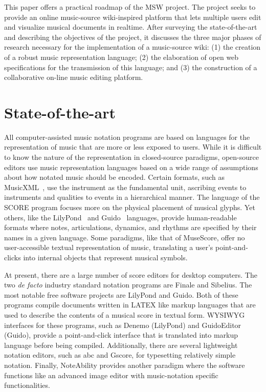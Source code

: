 \documentclass{article}
\begin{document}
This paper offers a practical roadmap
of the MSW project. The project seeks to provide an online music-source
wiki-inspired platform that lets multiple users edit and visualize
musical documents in realtime. After surveying the
state-of-the-art and describing the objectives of the project,
it discusses the three major phases of research necessary
for the implementation of a music-source wiki: (1) the creation of a robust
music representation language; (2) the elaboration of open web
specifications for the transmission of this language; and (3) the
construction of a collaborative on-line music editing platform.
\section{State-of-the-art}\label{sec:state-of-the-art}

All computer-assisted music notation programs are based on languages for the
representation of music that are more or less exposed to users. While it is
difficult to know the nature of the representation in closed-source
paradigms, open-source editors use music representation languages based on a
wide range of assumptions about how notated music should be encoded. Certain
formats, such as MusicXML~\cite{good2001musicxml}, use the instrument as the fundamental unit,
ascribing events to instruments and qualities to events in a hierarchical
manner. The language of the SCORE program focuses more on the physical
placement of musical glyphs. Yet others, like the LilyPond~\cite{lilypond06} and
Guido~\cite{hoos98}
languages, provide human-readable formats where notes, articulations,
dynamics, and rhythms are specified by their names in a given language. Some
paradigms, like that of MuseScore, offer no user-accessible textual representation
of music, translating a user’s point-and-clicks into internal objects that
represent musical symbols.

At present, there are a large number of score editors for desktop computers.
The two \emph{de facto} industry standard notation programs are Finale and
Sibelius. The most notable free software projects are LilyPond and
Guido. Both of these programs compile documents written in LATEX like
markup languages that are used to describe the contents of a musical score
in textual form. WYSIWYG interfaces for these programs, such as Denemo
(LilyPond) and GuidoEditor (Guido), provide a point-and-click interface that
is translated into markup language before being compiled. Additionally,
there are several lightweight notation editors, such as abc and Gscore, for
typesetting relatively simple notation. Finally, NoteAbility provides
another paradigm where the software functions like an advanced image editor
with music-notation specific functionalities.
\end{document}
